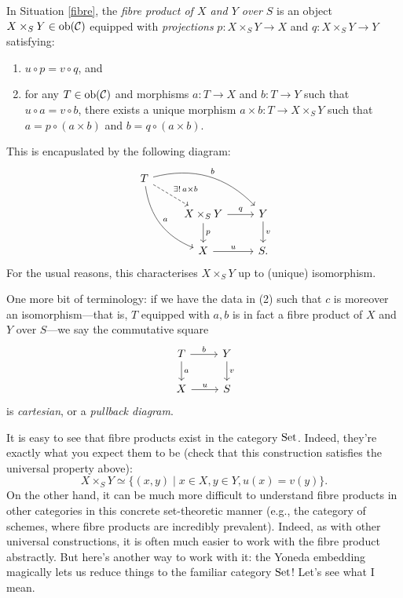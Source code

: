 \begin{definition}
In Situation \ref{fibre}, the \textit{fibre product of $X$ and $Y$
  over $S$} is an object $X \times_S Y \in {\operatorname{\textup{ob}}}(\mathcal{C})$ equipped with
\textit{projections} $p : X \times_S Y \to X$ and $q : X \times_S Y
\to Y$ satisfying:
\begin{enumerate}
\item $u \circ p = v \circ q$, and
\item for any $T \in {\operatorname{\textup{ob}}}(\mathcal{C})$ and morphisms $a : T \to X$ and $b : T
  \to Y$ such that $u \circ a = v \circ b$, there exists a unique
  morphism $a \times b : T \to X \times_S Y$ such that $a = p \circ (a
  \times b)$ and $b = q \circ (a \times b)$.
\end{enumerate}
This is encapuslated by the following diagram:
\[
\begin{tikzcd}
  T \ar[bend left]{rrd}{b} \ar[bend right]{ddr}{a}
  \ar[dashed]{dr}{\exists!\, a \times b} & & \\ & X \times_S Y \rar{q}
  \dar{p} & Y \dar{v} \\ & X \rar{u} & S.
\end{tikzcd}
\]
For the usual reasons, this characterises $X \times_S Y$ up to
(unique) isomorphism.

One more bit of terminology: if we have the data in (2) such that $c$
is moreover an isomorphism---that is, $T$ equipped with $a,b$ is in
fact a fibre product of $X$ and $Y$ over $S$---we say the commutative
square
\[
\begin{tikzcd}
  T \rar{b} \dar{a} & Y \dar{v} \\ X \rar{u} & S
\end{tikzcd}
\]
is \textit{cartesian}, or a \textit{pullback diagram}.
\end{definition}

\begin{example}
  It is easy to see that fibre products exist in the category
  ${\operatorname{\textup{Set}}}$. Indeed, they're exactly what you expect them to be (check
  that this construction satisfies the universal property above):
  \[
  X \times_S Y \simeq \{(x, y) \mid x \in X, y \in Y, u(x) = v(y)\}.
  \]
  On the other hand, it can be much more difficult to understand fibre
  products in other categories in this concrete set-theoretic manner
  (e.g., the category of schemes, where fibre products are incredibly
  prevalent). Indeed, as with other universal constructions, it is
  often much easier to work with the fibre product abstractly. But
  here's another way to work with it: the Yoneda embedding magically
  lets us reduce things to the familiar category ${\operatorname{\textup{Set}}}$!  Let's see
  what I mean.
\end{example}


